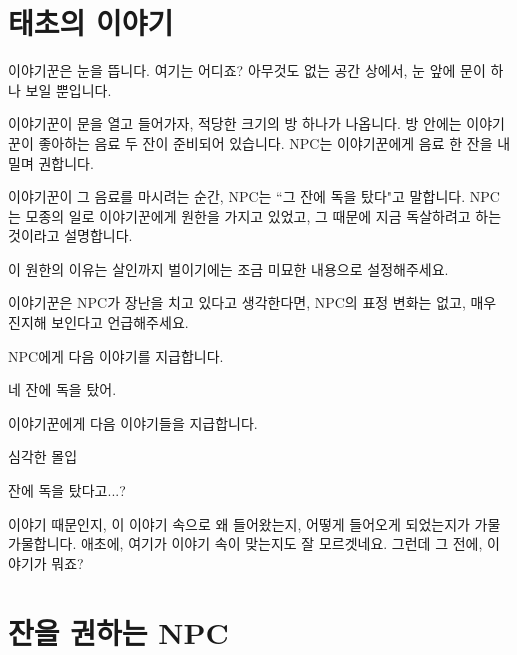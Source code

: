 \documentclass{report}
\begin{document}
	\section{태초의 이야기}
	이야기꾼은 눈을 뜹니다. 여기는 어디죠? 아무것도 없는 공간 상에서, 눈 앞에 문이 하나 보일 뿐입니다.
	
	이야기꾼이 문을 열고 들어가자, 적당한 크기의 방 하나가 나옵니다. 방 안에는 이야기꾼이 좋아하는 음료 두 잔이 준비되어 있습니다. NPC는 이야기꾼에게 음료 한 잔을 내밀며 권합니다.
	
	이야기꾼이 그 음료를 마시려는 순간, NPC는 ``그 잔에 독을 탔다"고 말합니다. NPC는 모종의 일로 이야기꾼에게 원한을 가지고 있었고, 그 때문에 지금 독살하려고 하는 것이라고 설명합니다.
	
	이 원한의 이유는 살인까지 벌이기에는 조금 미묘한 내용으로 설정해주세요.
	
	이야기꾼은 NPC가 장난을 치고 있다고 생각한다면, NPC의 표정 변화는 없고, 매우 진지해 보인다고 언급해주세요.
	
	NPC에게 다음 이야기를 지급합니다.
	
	\begin{lite}{네 잔에 독을 탔어.}
	\end{lite}
	
	이야기꾼에게 다음 이야기들을 지급합니다.
	
	\begin{lite}{심각한 몰입}
		
	\end{lite}
	
	\begin{lite}{잔에 독을 탔다고...?}
	\end{lite}
	
	 이야기 때문인지, 이 이야기 속으로 왜 들어왔는지, 어떻게 들어오게 되었는지가 가물가물합니다. 애초에, 여기가 이야기 속이 맞는지도 잘 모르겟네요. 그런데 그 전에, 이야기가 뭐죠?
	
	\section{잔을 권하는 NPC}
	
\end{document}
